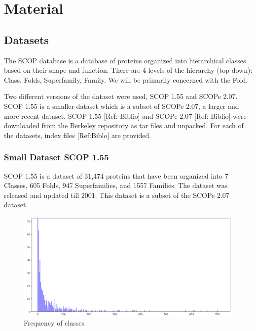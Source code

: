 \documentclass[12pt, a4paper, twocolumn, fullpage]{article}
\theoremstyle{plain}
\theoremstyle{definition}
\theoremstyle{remark}
\begin{document}
\section{Material}

\subsection{Datasets}

The SCOP database is a database of proteins organized into hierarchical classes based on their shape and function. There are 4 levels of the hierarchy (top down): Class, Folds, Superfamily, Family. We will be primarily concerned with the Fold.

Two different versions of the dataset were used, SCOP 1.55 and SCOPe 2.07. SCOP 1.55 is a smaller dataset which is a subset of SCOPe 2.07, a larger and more recent dataset. SCOP 1.55 [Ref: Biblio] and SCOPe 2.07 [Ref: Biblio] were downloaded from the Berkeley repository as tar files and unpacked. For each of the datasets, index files [Ref:Biblo] are provided.

\subsubsection{Small Dataset SCOP 1.55}

SCOP 1.55 is a dataset of 31,474 proteins that have been organized into 7 Classes, 605 Folds, 947 Superfamilies, and 1557 Families. The dataset was released and updated till 2001. This dataset is a subset of the SCOPe 2.07 dataset.

\begin{figure}
	\includegraphics[width=\linewidth]{num_proteins_fold_155}
	\caption{Frequency of classes}
	\label{fig:boat1}
\end{figure}
\end{document}

